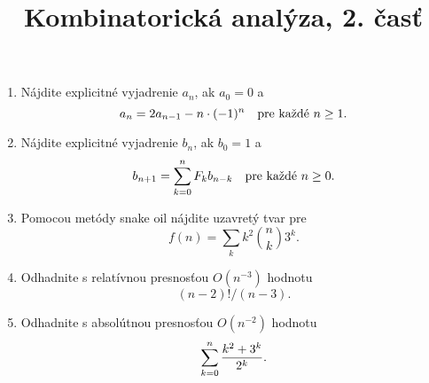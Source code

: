 \documentclass[a4paper, 12pt]{article}
\title{Kombinatorická analýza, 2. časť}
\date{}
\begin{document}
\begin{enumerate}
\item
Nájdite explicitné vyjadrenie $a_n$, ak $a_0=0$ a
$$
a_n = 2a_{n-1}-n\cdot(-1)^n\quad\hbox{pre každé $n\ge 1$}.
$$

\item
Nájdite explicitné vyjadrenie $b_n$, ak $b_0=1$ a
$$
b_{n+1} = \sum_{k=0}^n F_kb_{n-k}\quad\hbox{pre každé $n\ge 0$}.
$$

\item
Pomocou metódy snake oil nájdite uzavretý tvar pre
$$
f(n) = \sum_k k^2{n\choose k}3^k.
$$

\item
Odhadnite s relatívnou presnosťou $O(n^{-3})$ hodnotu
$$
(n-2)!/(n-3).
$$

\item
Odhadnite s absolútnou presnosťou $O(n^{-2})$ hodnotu
$$
\sum_{k=0}^n {k^2+3^k\over 2^k}.
$$


\end{enumerate}
\end{document}
